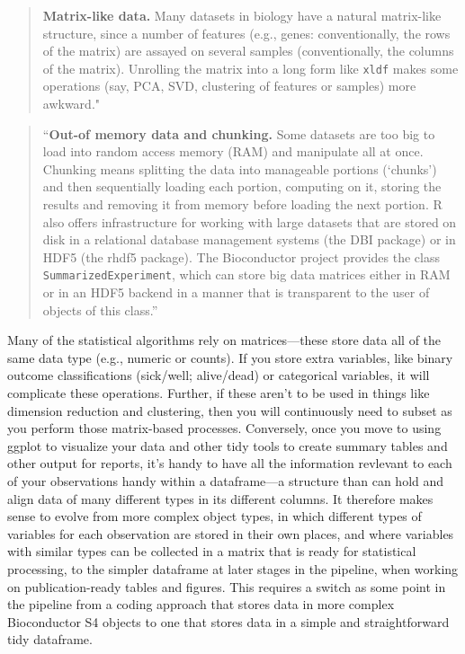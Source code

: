\documentclass[]{tufte-book}
\begin{document}
\begin{quote}
\textbf{Matrix-like data.} Many datasets in biology have a natural matrix-like
structure, since a number of features (e.g., genes: conventionally, the rows of
the matrix) are assayed on several samples (conventionally, the columns of the
matrix). Unrolling the matrix into a long form like \texttt{xldf} makes some operations
(say, PCA, SVD, clustering of features or samples) more awkward."
\citep{holmes2018modern}
\end{quote}

\begin{quote}
``\textbf{Out-of memory data and chunking.} Some datasets are too big to load
into random access memory (RAM) and manipulate all at once. Chunking means
splitting the data into manageable portions (`chunks') and then sequentially
loading each portion, computing on it, storing the results and removing it
from memory before loading the next portion. R also offers infrastructure
for working with large datasets that are stored on disk in a relational
database management systems (the DBI package) or in HDF5 (the rhdf5 package).
The Bioconductor project provides the class \texttt{SummarizedExperiment}, which
can store big data matrices either in RAM or in an HDF5 backend in a manner
that is transparent to the user of objects of this class.'' \citep{holmes2018modern}
\end{quote}

Many of the statistical algorithms rely on matrices---these store data all of
the same data type (e.g., numeric or counts). If you store extra variables, like
binary outcome classifications (sick/well; alive/dead) or categorical variables,
it will complicate these operations. Further, if these aren't to be used in things
like dimension reduction and clustering, then you will continuously need to
subset as you perform those matrix-based processes. Conversely, once you move
to using ggplot to visualize your data and other tidy tools to create summary
tables and other output for reports, it's handy to have all the information
revlevant to each of your observations handy within a dataframe---a structure
than can hold and align data of many different types in its different columns.
It therefore makes sense to evolve from more complex object types, in which
different types of variables for each observation are stored in their own places,
and where variables with similar types can be collected in a matrix that is
ready for statistical processing, to the simpler dataframe at later stages in
the pipeline, when working on publication-ready tables and figures. This requires
a switch as some point in the pipeline from a coding approach that stores data
in more complex Bioconductor S4 objects to one that stores data in a simple
and straightforward tidy dataframe.
\end{document}
